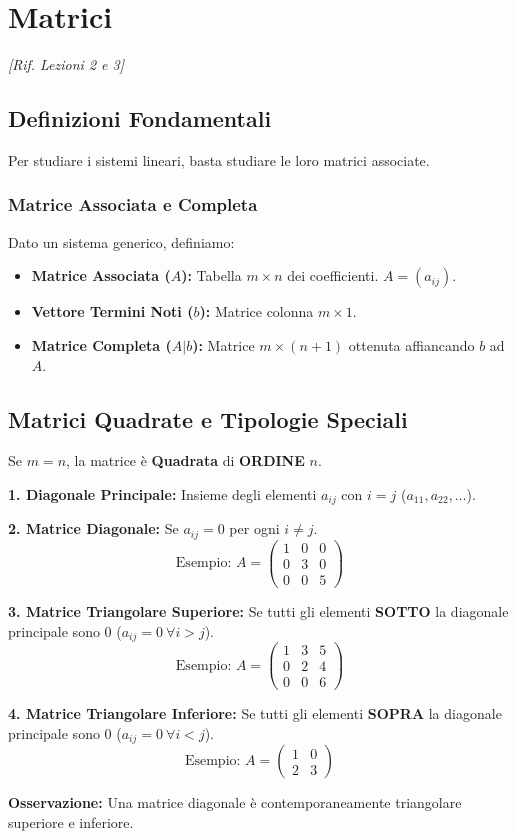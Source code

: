 \section{Matrici}
\emph{[Rif. Lezioni 2 e 3]}

\subsection{Definizioni Fondamentali}
Per studiare i sistemi lineari, basta studiare le loro matrici associate.

\subsubsection{Matrice Associata e Completa}
Dato un sistema generico, definiamo:
\begin{itemize}
    \item \textbf{Matrice Associata ($A$):} Tabella $m \times n$ dei coefficienti. $A = (a_{ij})$.
    \item \textbf{Vettore Termini Noti ($b$):} Matrice colonna $m \times 1$.
    \item \textbf{Matrice Completa ($A|b$):} Matrice $m \times (n+1)$ ottenuta affiancando $b$ ad $A$.
\end{itemize}

\subsection{Matrici Quadrate e Tipologie Speciali}
Se $m=n$, la matrice è \textbf{Quadrata} di \textbf{ORDINE} $n$.

\begin{definitionbox}
\textbf{1. Diagonale Principale:} Insieme degli elementi $a_{ij}$ con $i=j$ ($a_{11}, a_{22}, \dots$).

\textbf{2. Matrice Diagonale:} Se $a_{ij} = 0$ per ogni $i \neq j$.
$$ \text{Esempio: } A = \begin{pmatrix} 1 & 0 & 0 \\ 0 & 3 & 0 \\ 0 & 0 & 5 \end{pmatrix} $$

\textbf{3. Matrice Triangolare Superiore:} Se tutti gli elementi \textbf{SOTTO} la diagonale principale sono 0 ($a_{ij}=0 \ \forall i > j$).
$$ \text{Esempio: } A = \begin{pmatrix} 1 & 3 & 5 \\ 0 & 2 & 4 \\ 0 & 0 & 6 \end{pmatrix} $$

\textbf{4. Matrice Triangolare Inferiore:} Se tutti gli elementi \textbf{SOPRA} la diagonale principale sono 0 ($a_{ij}=0 \ \forall i < j$).
$$ \text{Esempio: } A = \begin{pmatrix} 1 & 0 \\ 2 & 3 \end{pmatrix} $$

\textbf{Osservazione:} Una matrice diagonale è contemporaneamente triangolare superiore e inferiore.
\end{definitionbox}
